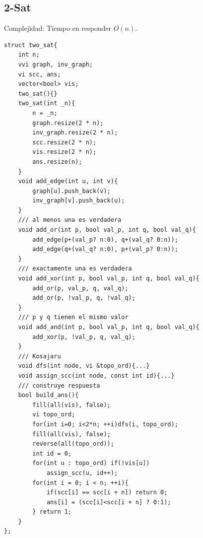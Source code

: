 \documentclass[10pt,spanish,mexico]{article}
\numberwithin{equation}{section}
\begin{document}
\begin{multicols}{2}
\vspace{-1.2\baselineskip}
\hrulefill
\subsection{2-Sat}
Complejidad: Tiempo en responder $O(n)$.
\begin{verbatim}
struct two_sat{
    int n;
    vvi graph, inv_graph;
    vi scc, ans;
    vector<bool> vis;
    two_sat(){}
    two_sat(int _n){
        n = _n;
        graph.resize(2 * n);
        inv_graph.resize(2 * n);
        scc.resize(2 * n);
        vis.resize(2 * n);
        ans.resize(n);
    }
    void add_edge(int u, int v){
        graph[u].push_back(v);
        inv_graph[v].push_back(u);
    }
    /// al menos una es verdadera
    void add_or(int p, bool val_p, int q, bool val_q){
        add_edge(p+(val_p? n:0), q+(val_q? 0:n));
        add_edge(q+(val_q? n:0), p+(val_p? 0:n));
    }
    /// exactamente una es verdadera
    void add_xor(int p, bool val_p, int q, bool val_q){
        add_or(p, val_p, q, val_q);
        add_or(p, !val_p, q, !val_q);
    }
    /// p y q tienen el mismo valor
    void add_and(int p, bool val_p, int q, bool val_q){
        add_xor(p, !val_p, q, val_q);
    }
    /// Kosajaru
    void dfs(int node, vi &topo_ord){...}
    void assign_scc(int node, const int id){...}
    /// construye respuesta
    bool build_ans(){
        fill(all(vis), false);
        vi topo_ord;
        for(int i=0; i<2*n; ++i)dfs(i, topo_ord);
        fill(all(vis), false);
        reverse(all(topo_ord));
        int id = 0;
        for(int u : topo_ord) if(!vis[u])
            assign_scc(u, id++);
        for(int i = 0; i < n; ++i){
            if(scc[i] == scc[i + n]) return 0;
            ans[i] = (scc[i]<scc[i + n] ? 0:1);
        } return 1;
    }
};
\end{verbatim}

\vspace{-1.2\baselineskip}
\hrulefill

\end{multicols}
\end{document}
